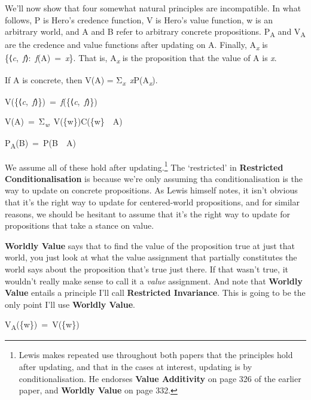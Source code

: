 \documentclass[
  11pt,
  letterpaper,
  DIV=11,
  numbers=noendperiod,
  twoside]{scrartcl}
\providecommand{\tightlist}{%
  \setlength{\itemsep}{0pt}\setlength{\parskip}{0pt}}\usepackage{longtable,booktabs,array}
\begin{document}
We'll now show that four somewhat natural principles are incompatible.
In what follows, P is Hero's credence function, V is Hero's value
function, w is an arbitrary world, and A and B refer to arbitrary
concrete propositions. P\textsubscript{A} and V\textsubscript{A} are the
credence and value functions after updating on A. Finally,
A\textsubscript{\emph{x}} is
\{⟨\emph{c},~\emph{f}⟩:~\emph{f}(A)~=~\emph{x}\}. That is,
A\textsubscript{\emph{x}} is the proposition that the value of A is
\emph{x}.

\begin{description}
\tightlist
\item[Ludovician Desire as Belief]
If A is concrete, then V(A) =
Σ\textsubscript{\emph{x}}~\emph{x}P(A\textsubscript{\emph{x}}).
\item[Worldly Value]
V(\{⟨\emph{c},~\emph{f}⟩\})~=~\emph{f}(\{⟨\emph{c},~\emph{f}⟩\})
\item[Value Additivity]
V(A)~=~Σ\textsubscript{\emph{w}}~V(\{w\})C(\{w\}~\textbar~A)
\item[Restricted Conditionalisation]
P\textsubscript{A}(B)~=~P(B~\textbar~A)
\end{description}

We assume all of these hold after updating.\footnote{Lewis makes
  repeated use throughout both papers that the principles hold after
  updating, and that in the cases at interest, updating is by
  conditionalisation. He endorses \textbf{Value Additivity} on page 326
  of the earlier paper, and \textbf{Worldly Value} on page 332.} The
`restricted' in \textbf{Restricted Conditionalisation} is because we're
only assuming tha conditionalisation is the way to update on concrete
propositions. As Lewis himself notes, it isn't obvious that it's the
right way to update for centered-world propositions, and for similar
reasons, we should be hesitant to assume that it's the right way to
update for propositions that take a stance on value.

\textbf{Worldly Value} says that to find the value of the proposition
true at just that world, you just look at what the value assignment that
partially constitutes the world says about the proposition that's true
just there. If that wasn't true, it wouldn't really make sense to call
it a \emph{value} assignment. And note that \textbf{Worldly Value}
entails a principle I'll call \textbf{Restricted Invariance}. This is
going to be the only point I'll use \textbf{Worldly Value}.

\begin{description}
\tightlist
\item[Restricted Invariance]
V\textsubscript{A}(\{w\})~=~V(\{w\})
\end{description}
\end{document}
